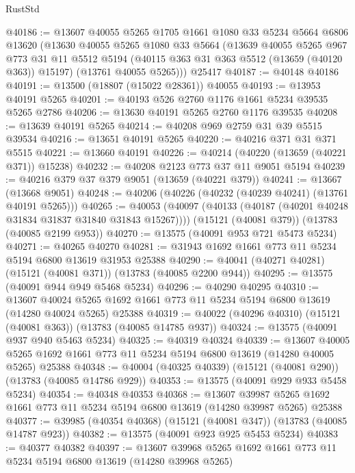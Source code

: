 \begin{lexlean}{RustStd}
\begin{coremodule}
@40186 := @13607
    @40055
    @5265
    @1705
    @1661
    @1080
    @33
    @5234
    @5664
    @6806
    @13620
    (@13630
      @40055
      @5265
      @1080
      @33
      @5664
      (@13639
        @40055
        @5265
        @967
        @773
        @31
        @11
        @5512
        @5194
        (@40115 @363 @31 @363 @5512 (@13659 (@40120 @363)) @15197)
        (@13761 @40055 @5265)))
    @25417
@40187 := @40148 @40186
@40191 := @13500 (@18807 (@15022 @28361)) @40055
@40193 := @13953 @40191 @5265
@40201 := @40193 @526 @2760 @1176 @1661 @5234 @39535 @5265 @2786
@40206 := @13630 @40191 @5265 @2760 @1176 @39535
@40208 := @13639 @40191 @5265
@40214 := @40208 @969 @2759 @31 @39 @5515 @39534
@40216 := @13651 @40191 @5265
@40220 := @40216 @371 @31 @371 @5515
@40221 := @13660 @40191
@40226 := @40214 (@40220 (@13659 (@40221 @371)) @15238)
@40232 := @40208 @2123 @773 @37 @11 @9051 @5194
@40239 := @40216 @379 @37 @379 @9051 (@13659 (@40221 @379))
@40241 := @13667 (@13668 @9051)
@40248 := @40206 (@40226 (@40232 (@40239 @40241) (@13761 @40191 @5265)))
@40265 := @40053
    (@40097 (@40133 (@40187 (@40201 @40248 @31834 @31837 @31840 @31843 @15267))))
    (@15121 (@40081 @379))
    (@13783 (@40085 @2199 @953))
@40270 := @13575 (@40091 @953 @721 @5473 @5234)
@40271 := @40265 @40270
@40281 := @31943 @1692 @1661 @773 @11 @5234 @5194 @6800 @13619 @31953 @25388
@40290 := @40041 (@40271 @40281) (@15121 (@40081 @371)) (@13783 (@40085 @2200 @944))
@40295 := @13575 (@40091 @944 @949 @5468 @5234)
@40296 := @40290 @40295
@40310 := @13607
    @40024
    @5265
    @1692
    @1661
    @773
    @11
    @5234
    @5194
    @6800
    @13619
    (@14280 @40024 @5265)
    @25388
@40319 := @40022 (@40296 @40310) (@15121 (@40081 @363)) (@13783 (@40085 @14785 @937))
@40324 := @13575 (@40091 @937 @940 @5463 @5234)
@40325 := @40319 @40324
@40339 := @13607
    @40005
    @5265
    @1692
    @1661
    @773
    @11
    @5234
    @5194
    @6800
    @13619
    (@14280 @40005 @5265)
    @25388
@40348 := @40004 (@40325 @40339) (@15121 (@40081 @290)) (@13783 (@40085 @14786 @929))
@40353 := @13575 (@40091 @929 @933 @5458 @5234)
@40354 := @40348 @40353
@40368 := @13607
    @39987
    @5265
    @1692
    @1661
    @773
    @11
    @5234
    @5194
    @6800
    @13619
    (@14280 @39987 @5265)
    @25388
@40377 := @39985 (@40354 @40368) (@15121 (@40081 @347)) (@13783 (@40085 @14787 @923))
@40382 := @13575 (@40091 @923 @925 @5453 @5234)
@40383 := @40377 @40382
@40397 := @13607
    @39968
    @5265
    @1692
    @1661
    @773
    @11
    @5234
    @5194
    @6800
    @13619
    (@14280 @39968 @5265)

\end{coremodule}
\end{lexlean}
